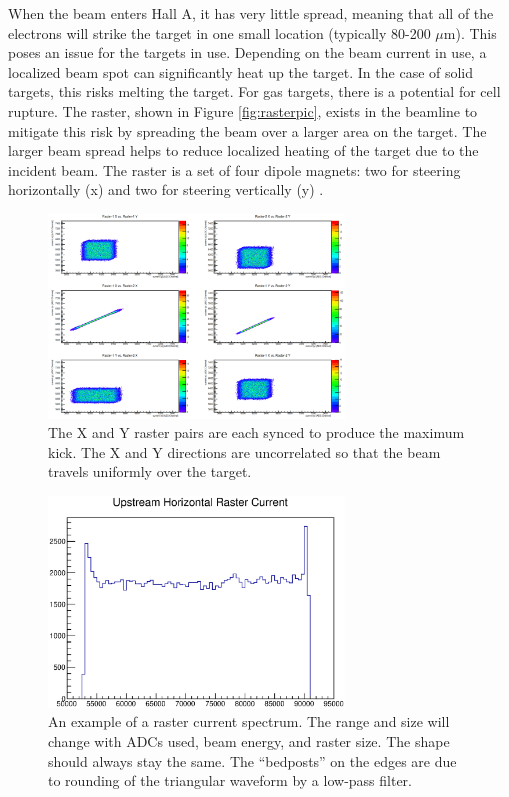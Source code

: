 When the beam enters Hall A, it has very little spread, meaning that all of the electrons will strike the target in one small location (typically 80-200 $\mu$m). This poses an issue for the targets in use. Depending on the beam current in use, a localized beam spot can significantly heat up the target. In the case of solid targets, this risks melting the target. For gas targets, there is a potential for cell rupture. The raster, shown in Figure \ref{fig:rasterpic}, exists in the beamline to mitigate this risk by spreading the beam over a larger area on the target. The larger beam spread helps to reduce localized heating of the target due to the incident beam. The raster is a set of four dipole magnets: two for steering horizontally (x) and two for steering vertically (y) \cite{Bob}.

\begin{figure}[h]
\begin{center}
	\includegraphics[width=0.7\textwidth]{./setup/fig/raster_sync.png}
	\caption{The X and Y raster pairs are each synced to produce the maximum kick. The X and Y directions are uncorrelated so that the beam travels uniformly over the target.}
	\label{fig:raster}
\end{center}
\end{figure}

\begin{figure}[h!]
\begin{center}
	\includegraphics[width=0.7\textwidth]{./setup/fig/ex_rast.eps}
	\caption{An example of a raster current spectrum. The range and size will change with ADCs used, beam energy, and raster size. The shape should always stay the same. The ``bedposts'' on the edges are due to rounding of the triangular waveform by a low-pass filter.}
	\label{fig:exrast}
\end{center}
\end{figure}

